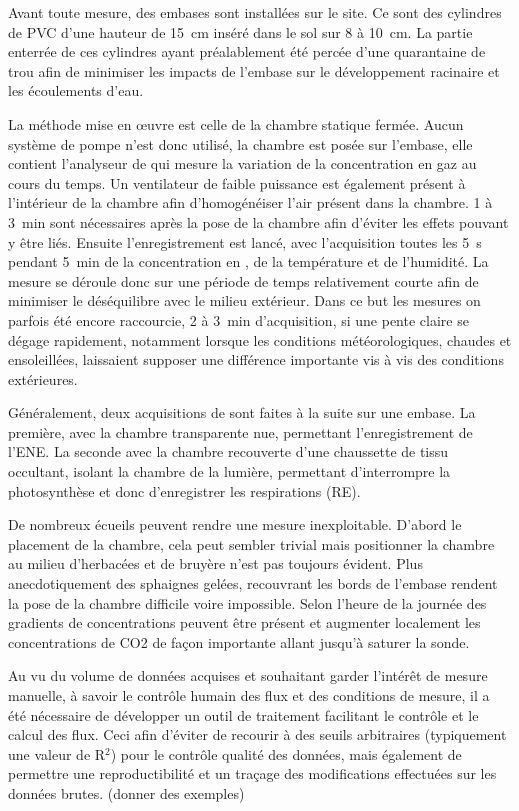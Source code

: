 Avant toute mesure, des embases sont installées sur le site.
Ce sont des cylindres de PVC d'une hauteur de \SI{15}{\centi\metre} inséré dans le sol sur 8 à \SI{10}{\centi\metre}.
La partie enterrée de ces cylindres ayant préalablement été percée d'une quarantaine de trou afin de minimiser les impacts de l'embase sur le développement racinaire et les écoulements d'eau.

La méthode mise en œuvre est celle de la chambre statique fermée.
Aucun système de pompe n'est donc utilisé, la chambre est posée sur l'embase, elle contient l'analyseur de \coo qui mesure la variation de la concentration en gaz au cours du temps.
Un ventilateur de faible puissance est également présent à l'intérieur de la chambre afin d'homogénéiser l'air présent dans la chambre.
1 à \SI{3}{\minute} sont nécessaires après la pose de la chambre afin d'éviter les effets pouvant y être liés.
Ensuite l’enregistrement est lancé, avec l'acquisition toutes les \SI{5}{\second} pendant \SI{5}{\minute} de la concentration en \coo, de la température et de l'humidité.
La mesure se déroule donc sur une période de temps relativement courte afin de minimiser le déséquilibre avec le milieu extérieur.
Dans ce but les mesures on parfois été encore raccourcie, 2 à \SI{3}{\minute} d'acquisition, si une pente claire se dégage rapidement, notamment lorsque les conditions météorologiques, chaudes et ensoleillées, laissaient supposer une différence importante vis à vis des conditions extérieures.

Généralement, deux acquisitions de \coo sont faites à la suite sur une embase.
La première, avec la chambre transparente nue, permettant l'enregistrement de l'ENE.
La seconde avec la chambre recouverte d'une chaussette de tissu occultant, isolant la chambre de la lumière, permettant d'interrompre la photosynthèse et donc d'enregistrer les respirations (RE).


De nombreux écueils peuvent rendre une mesure inexploitable. D'abord le placement de la chambre, cela peut sembler trivial mais positionner la chambre au milieu d'herbacées et de bruyère n'est pas toujours évident. Plus anecdotiquement des sphaignes gelées, recouvrant les bords de l'embase rendent la pose de la chambre difficile voire impossible. Selon l'heure de la journée des gradients de concentrations peuvent être présent et augmenter localement les concentrations de CO2 de façon importante allant jusqu'à saturer la sonde.

Au vu du volume de données acquises et souhaitant garder l'intérêt de mesure manuelle, à savoir le contrôle humain des flux et des conditions de mesure, il a été nécessaire de développer un outil de traitement facilitant le contrôle et le calcul des flux.
Ceci afin d'éviter de recourir à des seuils arbitraires (typiquement une valeur de R$^{2}$) pour le contrôle qualité des données, mais également de permettre une reproductibilité et un traçage des modifications effectuées sur les données brutes.
(donner des exemples)

